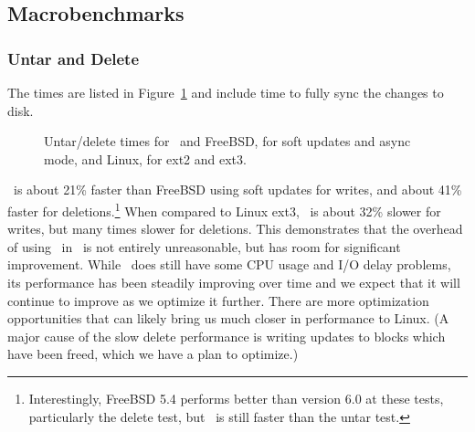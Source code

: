 \subsection {Macrobenchmarks}
\label{sec:eval:macro}

\subsubsection{Untar and Delete}
\label{sec:eval:untardel}

The times are listed in Figure~\ref{fig:macro} and include time to
fully sync the changes to disk.

\begin{figure}[htb]
\caption{\label{fig:macro} Untar/delete times for \Kudos\ and FreeBSD, for soft
updates and async mode, and Linux, for ext2 and ext3.}
\end{figure}

\Kudos\ is about 21\% faster than FreeBSD using soft updates for
writes, and about 41\% faster for deletions.\footnote{Interestingly, FreeBSD 5.4
performs better than version 6.0 at these tests, particularly the delete test,
but \Kudos\ is still faster than the untar test.}
%
When compared to Linux ext3, \Kudos\ is about 32\% slower for writes, but many
times slower for deletions.
%
This demonstrates that the overhead of using \chdescs\ in \Kudos\ is not
entirely unreasonable, but has room for significant improvement.
%
While \Kudos\ does still have some CPU usage and I/O delay problems, its
performance has been steadily improving over time and we expect that it will
continue to improve as we optimize it further.
%
There are more optimization opportunities that can likely bring us much closer
in performance to Linux. (A major cause of the slow delete performance is writing
updates to blocks which have been freed, which we have a plan to optimize.)

